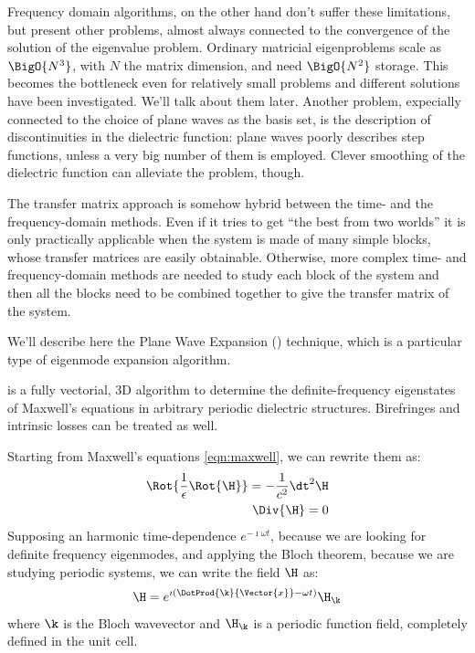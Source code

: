 Frequency domain algorithms, on the other hand don't suffer these
limitations, but present other problems, almost always connected to
the convergence of the solution of the eigenvalue problem. Ordinary
matricial eigenproblems scale as $\BigO{N^3}$, with $N$ the matrix
dimension, and need $\BigO{N^2}$ storage. This becomes the bottleneck even
for relatively small problems and different solutions have been
investigated. We'll talk about them later. Another problem, expecially
connected to the choice of plane waves as the basis set, is the
description of discontinuities in the dielectric function: plane waves
poorly describes step functions, unless a very big number of them is
employed. Clever smoothing of the dielectric function can alleviate
the problem, though.

The transfer matrix approach is somehow hybrid between the time- and
the frequency-domain methods. Even if it tries to get ``the best from
two worlds'' it is only practically applicable when the system is made
of many simple blocks, whose transfer matrices are easily
obtainable. Otherwise, more complex time- and frequency-domain methods
are needed to study each block of the system and then all the blocks
need to be combined together to give the transfer matrix of the
system.

We'll describe here the Plane Wave Expansion () technique, which is a
particular type of eigenmode expansion algorithm.

 is a fully vectorial, 3D algorithm to determine the
definite-frequency eigenstates of Maxwell's equations in arbitrary
periodic dielectric structures. Birefringes and intrinsic losses can
be treated as well.

Starting from Maxwell's equations \ref{eqn:maxwell}, we can rewrite
them as:
\begin{eqnarray}
\Rot{\frac{1}{\epsilon}\Rot{\H}} = -\frac{1}{c^2} \dt^2 \H
\label{eqn:helmholtz} \\
\Div{\H} = 0 \label{eqn:divergence}
\end{eqnarray}
Supposing an harmonic time-dependence $e^{-\imath \omega t}$, because
we are looking for definite frequency eigenmodes, and applying the
Bloch theorem, because we are studying periodic systems, we can write
the field $\H$ as:
\begin{equation} \label{eqn:bloch}
\H = e^{\imath(\DotProd{\k}{\Vector{x}} - \omega t)}
\H_{\k}
\end{equation}
where $\k$ is the Bloch wavevector and $\H_{\k}$ is a
periodic function field, completely defined in the unit cell.

